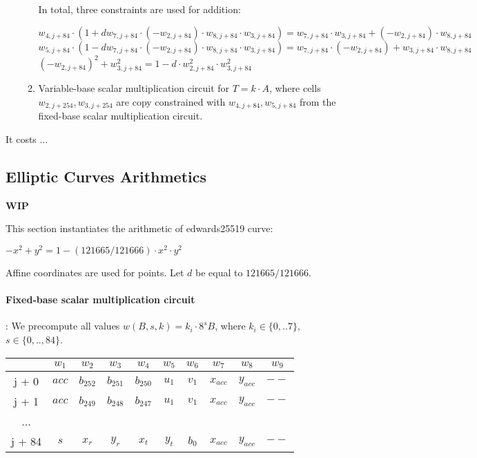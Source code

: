 \begin{enumerate}
\begin{enumerate}
                In total, three constraints are used for addition:
                \begin{center}
                    $w_{4, j + 84}\cdot (1 + d w_{7, j + 84} \cdot (-w_{2, j + 84}) \cdot w_{8, j + 84} \cdot w_{3, j + 84}) = w_{7, j + 84} \cdot w_{3, j + 84} + (-w_{2, j + 84}) \cdot w_{8, j + 84}$ \\
                    $w_{5, j + 84} \cdot (1 - d w_{7, j + 84} \cdot (-w_{2, j + 84}) \cdot w_{8, j + 84} \cdot w_{3, j + 84}) = w_{7, j + 84} \cdot (-w_{2, j + 84}) + w_{3, j + 84} \cdot w_{8, j + 84}$ \\
                    $(- w_{2, j + 84})^2 + w_{3, j + 84}^2 = 1 - d \cdot w_{2, j + 84}^2 \cdot w_{3, j + 84}^2$
                \end{center}
            \item Variable-base scalar multiplication circuit for $T = k \cdot A$, where cells $w_{2, j + 254}, w_{3, j + 254}$ are copy constrained with $w_{4, j + 84}, w _{5, j + 84}$ from the fixed-base scalar multiplication circuit.
        \end{enumerate}
\end{enumerate}
It costs $..$.
\subsection{Elliptic Curves Arithmetics}
\label{ellcurve}
\textbf{WIP}

This section instantiates the arithmetic of edwards25519 curve:
\begin{center}
    $- x^2 + y^2 = 1 - (121665/121666) \cdot x^2 \cdot y^2$
\end{center}
Affine coordinates are used for points.
Let $d$ be equal to $121665/121666$.

\paragraph{Fixed-base scalar multiplication circuit}:
We precompute all values $w(B,s,k) = k_i \cdot 8^s B$, where $k_i \in \{ 0,..7 \}$, $s \in \{0,.., 84\}$.
\begin{center}
    \begin{tabular}{ c|c|c|c|c|c|c|c|c|c }
        & $w_1$  & $w_2$  & $w_3$  & $w_4$  & $w_5$  & $w_6$ & $w_7$ & $w_8$ & $w_9$  \\
        \hline
        j + 0  & $acc$  & $b_{252}$ & $b_{251}$ & $b_{250}$ & $u_1$ & $v_1$ & $x_{acc}$ & $y_{acc}$ & $--$   \\
        j + 1  & $acc$  & $b_{249}$ & $b_{248}$ & $b_{247}$ & $u_1$ & $v_1$ & $x_{acc}$ & $y_{acc}$ & $--$   \\
        ...    &             &             &             &             &      & & & &  \\
        j + 84 & $s$  & $x_r$ & $y_r$ & $x_t$ & $y_t$ & $b_{0}$ & $x_{acc}$ & $y_{acc}$ & $--$   \\
    \end{tabular}
\end{center}

